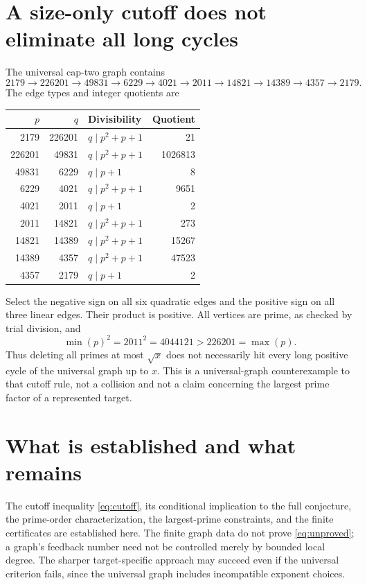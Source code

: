 \documentclass[11pt]{article}
\begin{document}
\section{A size-only cutoff does not eliminate all long cycles}
The universal cap-two graph contains
\[
 2179\to226201\to49831\to6229\to4021\to2011
 \to14821\to14389\to4357\to2179.
\]
The edge types and integer quotients are
\begin{center}
\begin{tabular}{@{}rrlr@{}}\toprule
$p$ & $q$ & Divisibility & Quotient\\\midrule
2179&226201&$q\mid p^2+p+1$&21\\
226201&49831&$q\mid p^2+p+1$&1026813\\
49831&6229&$q\mid p+1$&8\\
6229&4021&$q\mid p^2+p+1$&9651\\
4021&2011&$q\mid p+1$&2\\
2011&14821&$q\mid p^2+p+1$&273\\
14821&14389&$q\mid p^2+p+1$&15267\\
14389&4357&$q\mid p^2+p+1$&47523\\
4357&2179&$q\mid p+1$&2\\\bottomrule
\end{tabular}
\end{center}
Select the negative sign on all six quadratic edges and the positive sign on all three linear edges. Their product is positive. All vertices are prime, as checked by trial division, and
\[
 \min(p)^2=2011^2=4044121>226201=\max(p).
\]
Thus deleting all primes at most $\sqrt{x}$ does not necessarily hit every long positive cycle of the universal graph up to $x$. This is a universal-graph counterexample to that cutoff rule, not a collision and not a claim concerning the largest prime factor of a represented target.

\section{What is established and what remains}
The cutoff inequality \eqref{eq:cutoff}, its conditional implication to the full conjecture, the prime-order characterization, the largest-prime constraints, and the finite certificates are established here. The finite graph data do not prove \eqref{eq:unproved}; a graph's feedback number need not be controlled merely by bounded local degree. The sharper target-specific approach may succeed even if the universal criterion fails, since the universal graph includes incompatible exponent choices.
\end{document}
